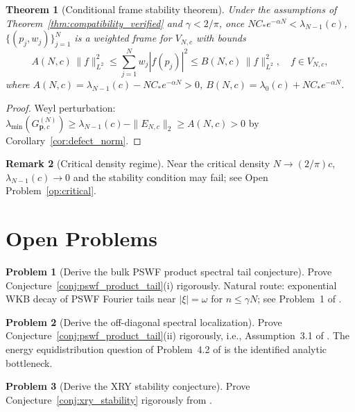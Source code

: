 \documentclass[12pt,a4paper]{amsart}
\newtheorem{theorem}{Theorem}[section]
\theoremstyle{definition}
\newtheorem{remark}[theorem]{Remark}
\newtheorem{problem}{Problem}[section]
\newcommand{\GVM}{G^{(N)}_{\mathbf{p},c}}
\newcommand{\EN}{E_{N,c}}
\newcommand{\norm}[1]{\|#1\|}
\begin{document}
\begin{theorem}[Conditional frame stability theorem]\label{thm:frame_stability}
Under the assumptions of Theorem~\ref{thm:compatibility_verified}
and $\gamma<2/\pi$, once $NC_*e^{-\alpha N}<\lambda_{N-1}(c)$,
$\{(p_j,w_j)\}_{j=1}^N$ is a weighted frame for $V_{N,c}$ with bounds
\[
  A(N,c)\,\norm{f}_{L^2}^2
  \le \sum_{j=1}^N w_j|f(p_j)|^2
  \le B(N,c)\,\norm{f}_{L^2}^2,
  \quad f\in V_{N,c},
\]
where $A(N,c)=\lambda_{N-1}(c)-NC_*e^{-\alpha N}>0$,
$B(N,c)=\lambda_0(c)+NC_*e^{-\alpha N}$.
\end{theorem}
\begin{proof}
Weyl perturbation: $\lambda_{\min}(\GVM)\ge\lambda_{N-1}(c)-\norm{\EN}_2
\ge A(N,c)>0$ by Corollary~\ref{cor:defect_norm}.
\end{proof}

\begin{remark}[Critical density regime]\label{rem:critical}
Near the critical density $N\to(2/\pi)c$,
$\lambda_{N-1}(c)\to0$ and the stability condition may fail;
see Open Problem~\ref{op:critical}.
\end{remark}

\section{Open Problems}\label{sec:open}

\begin{problem}[Derive the bulk PSWF product spectral tail conjecture]
\label{prob:bulkconj}
Prove Conjecture~\ref{conj:pswf_product_tail}(i) rigorously.
Natural route: exponential WKB decay of PSWF Fourier tails near $|\xi|=\omega$
for $n\le\gamma N$; see Problem~1 of \cite{PaperIII}.
\end{problem}

\begin{problem}[Derive the off-diagonal spectral localization]
Prove Conjecture~\ref{conj:pswf_product_tail}(ii) rigorously,
i.e., Assumption~3.1 of \cite{PaperIII}.
The energy equidistribution question of Problem~4.2 of \cite{PaperIII}
is the identified analytic bottleneck.
\end{problem}

\begin{problem}[Derive the XRY stability conjecture]
Prove Conjecture~\ref{conj:xry_stability} rigorously from \cite{Xiao2001,OsipovRokhlinXiao}.
\end{problem}
\end{document}
